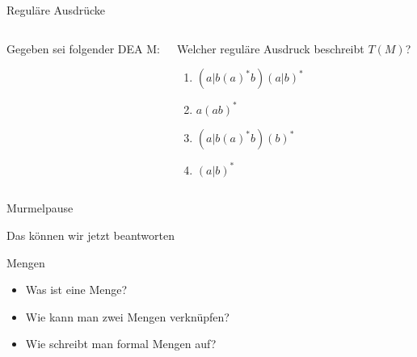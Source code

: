 {
\begin{frame}{Reguläre Ausdrücke}
\begin{columns}
\begin{alertblock} {Gegeben sei folgender DEA M:}
\end{alertblock}
    \begin{block}{Welcher reguläre Ausdruck beschreibt $T(M)$?}
        \begin{enumerate}
            \item \alert<2>{$(a|b(a)^*b)(a|b)^*$}
            \item $a(ab)^*$
            \item $(a|b(a)^*b)(b)^*$
            \item $(a|b)^*$
        \end{enumerate}
    \end{block}
\end{columns}
\end{frame}
}

\begin{frame}[standout]
  Murmelpause
\end{frame}

\begin{frame}[fragile]{Das können wir jetzt beantworten}
    \begin{alertblock}{Mengen}
    \begin{itemize}
        \item Was ist eine Menge?
        \item Wie kann man zwei Mengen verknüpfen?
        \item Wie schreibt man formal Mengen auf?
    \end{itemize}
    \end{alertblock}
\end{frame}

